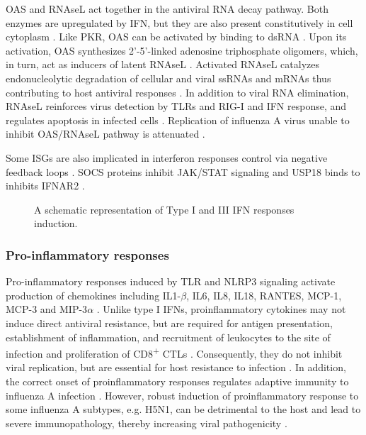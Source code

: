 		\gls{OAS} and \gls{RNAseL} act together in the antiviral RNA decay pathway. Both enzymes are upregulated by \gls{IFN}, but they are also present constitutively in cell cytoplasm \parencite{Sadler2008}. Like \gls{PKR}, \gls{OAS} can be activated by binding to dsRNA \parencite{Castelli1998}. Upon its activation, \gls{OAS} synthesizes 2'-5'-linked adenosine triphosphate oligomers, which, in turn, act as inducers of latent \gls{RNAseL} \parencite{Rebouillat1999}. Activated \gls{RNAseL} catalyzes endonucleolytic degradation of cellular and viral ssRNAs and mRNAs thus contributing to host antiviral responses \parencite{Dyer2006}. In addition to viral RNA elimination, \gls{RNAseL} reinforces virus detection by \gls{TLR}s and \gls{RIG-I} and \gls{IFN} response, and regulates apoptosis in infected cells \parencite{Liang2006}. Replication of influenza A virus unable to inhibit \gls{OAS}/\gls{RNAseL} pathway is attenuated \parencite{Min2006}.
		
		Some \gls{ISG}s are also implicated in interferon responses control via negative feedback loops \parencite{Schneider2014}. SOCS proteins inhibit JAK/STAT signaling \parencite{Hong2013} and USP18 binds to inhibits IFNAR2  \parencite{Ritchie2004}.
		
		\begin{figure} %
			\centering
			\caption{A schematic representation of Type I and III \gls{IFN} responses induction.} \label{fig:IFN}
		\end{figure}
		
		
		
		\subsubsection{Pro-inflammatory responses}
		
		Pro-inflammatory responses induced by \gls{TLR} and \gls{NLRP3} signaling activate production of chemokines including IL1-$\beta$, IL6, IL8, IL18, RANTES, MCP-1, MCP-3 and MIP-3$\alpha$ \parencite{Julkunen2000, LeGoffic2007}. Unlike type I \glspl{IFN}, proinflammatory cytokines may not induce direct antiviral resistance, but are required for antigen presentation, establishment of inflammation, and recruitment of leukocytes to the site of infection and proliferation of CD8\textsuperscript{+} \glspl{CTL} \parencite{VanDerSluijs2005, Schulz2005, LeGoffic2006}. Consequently, they do not inhibit viral replication, but are essential for host resistance to infection \parencite{Pang2013}. In addition, the correct onset of proinflammatory responses regulates adaptive immunity to influenza A infection \parencite{Trinchieri2003, Ichinohe2009}. However, robust induction of proinflammatory response to some influenza A subtypes, e.g. H5N1, can be detrimental to the host and lead to severe immunopathology, thereby increasing viral pathogenicity \parencite{LaGruta2007}.	
			
